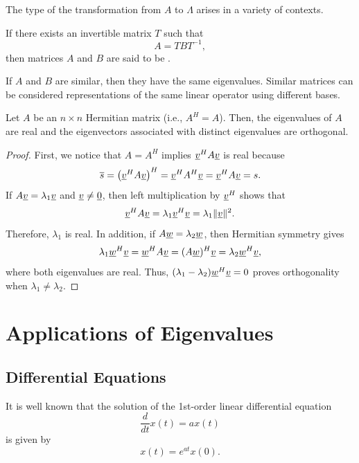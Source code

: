 The type of the transformation from $A$ to $\Lambda$ arises in a variety of contexts.
\begin{definition}
If there exists an invertible matrix $T$ such that
\begin{equation*}
A = T B T^{-1},
\end{equation*}
then matrices $A$ and $B$ are said to be .
\end{definition}

If $A$ and $B$ are similar, then they have the same eigenvalues.
Similar matrices can be considered representations of the same linear operator using different bases.

\begin{lemma}
Let $A$ be an $n\times n$ Hermitian matrix (i.e., $A^H = A$).
Then, the eigenvalues of $A$ are real and the eigenvectors associated with distinct eigenvalues are orthogonal.
\end{lemma}
\begin{proof}
First, we notice that $A = A^H$ implies $\underline{v}^H A \underline{v}$ is real because
\[ \overline{s} = \left( \underline{v}^H A \underline{v} \right)^H = \underline{v}^H A^H \underline{v} = \underline{v}^H A \underline{v} = s. \]
If $A \underline{v} = \lambda_1 \underline{v}$ and $\underline{v} \neq \underline{0}$, then left multiplication by $\underline{v}^H$ shows that
\[ \underline{v}^H A \underline{v} = \lambda_1 \underline{v}^H \underline{v} = \lambda_1 \| \underline{v} \|^2. \]
Therefore, $\lambda_1$ is real.
In addition, if $A\underline w=\lambda_2\underline w$, then Hermitian symmetry gives
\[\lambda_1\underline w^H\underline v=\underline w^HA\underline v=(A\underline w)^H\underline v=\lambda_2\underline w^H\underline v,\]
where both eigenvalues are real.
Thus, $(\lambda_1-\lambda_2)\underline w^H\underline v=0$ proves orthogonality when $\lambda_1\ne\lambda_2$.
\end{proof}

\section{Applications of Eigenvalues}

\subsection{Differential Equations}
\label{sec:Differential_Equations}

It is well known that the solution of the 1st-order linear differential equation
\[ \frac{d}{dt} x(t) = a x(t) \]
is given by
\[ x(t) = e^{at} x(0). \]

